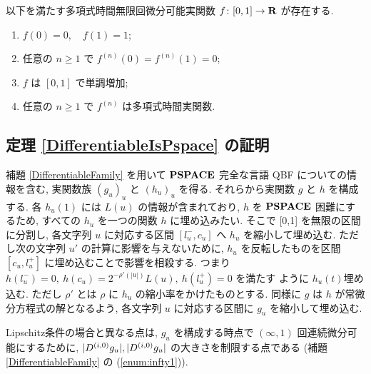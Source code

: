  \begin{lemma}
  \label{SmoothFunction}
  以下を満たす多項式時間無限回微分可能実関数 $f \colon [0,1] \to \mathbf R$ が存在する.
  \begin{enumerate}
   \item $f(0) = 0, \quad f(1) = 1$;
   \item 任意の $n \ge 1$ で $f^{(n)}(0) = f^{(n)}(1) = 0$;
   \item $f$ は $[0,1]$ で単調増加;
   \item 任意の $n \ge 1$ で $f^{(n)}$ は多項式時間実関数.
  \end{enumerate}
 \end{lemma} 


\subsection{定理 \ref{DifferentiableIsPspace} の証明}

 補題 \ref{DifferentiableFamily} を用いて
 $\mathbf{PSPACE}$ 完全な言語 {\sf QBF} についての情報を含む,
 実関数族 $(g_u)_u$ と $(h_u)_u$ を得る.
 それらから実関数 $g$ と $h$ を構成する.
 各 $h_u(1)$ には $L(u)$ の情報が含まれており,
 $h$ を $\mathbf{PSPACE}$ 困難にするため, 
 すべての $h_u$ を一つの関数 $h$ に埋め込みたい.
 そこで [0,1] を無限の区間に分割し, 各文字列 $u$ に対応する区間
 $[l^-_u, c_u]$ へ $h_u$ を縮小して埋め込む. 
 ただし次の文字列 $u'$ の計算に影響を与えないために,
 $h_u$ を反転したものを区間 $[c_u, l^+_u]$ に埋め込むことで影響を相殺する.
 つまり $h(l^-_u) = 0,\ h(c_u) = 2^{-\rho'(|u|)} L(u),\ h(l^+_u) = 0$ を満たす
 ように $h_u(t)$埋め込む.
 ただし $\rho'$ とは $\rho$ に $h_u$ の縮小率をかけたものとする.
 同様に $g$ は $h$ が常微分方程式の解となるよう,
 各文字列 $u$ に対応する区間に $g_u$ を縮小して埋め込む.

 Lipschitz条件の場合と異なる点は, $g_u$ を構成する時点で
 $(\infty, 1)$ 回連続微分可能にするために,
 $|D ^{(i, 0)} g_u|, |D ^{(i, 0)} g_u|$ の大きさを制限する点である
 (補題 \ref{DifferentiableFamily} の (\ref{enum:infty1})).
 
